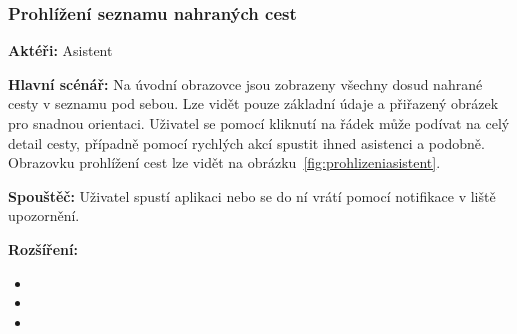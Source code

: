 \documentclass[czech,master,public,dept460,male,java,cpdeclaration]{diploma}
\newcommand{\usecase}[2]{\subsubsection{#1}\label{#2}}
\begin{document}
\usecase{Prohlížení seznamu nahraných cest}{prohlizeniasistent}
\textbf{Aktéři:} Asistent

\vspace{0.1cm}
\noindent
\textbf{Hlavní scénář:} Na úvodní obrazovce jsou zobrazeny všechny dosud nahrané cesty v seznamu pod sebou.
Lze vidět pouze základní údaje a přiřazený obrázek pro snadnou orientaci. Uživatel se pomocí
kliknutí na řádek může podívat na celý detail cesty, případně pomocí rychlých akcí spustit ihned asistenci
a podobně. Obrazovku prohlížení cest lze vidět na obrázku~\ref{fig:prohlizeniasistent}.

\vspace{0.1cm}
\noindent
\textbf{Spouštěč:} Uživatel spustí aplikaci nebo se do ní vrátí pomocí notifikace v liště upozornění.

\vspace{0.1cm}
\noindent
\textbf{Rozšíření:}
\begin{itemize}
  \item {}
  \item {}
  \item {}
\end{itemize}
\end{document}
